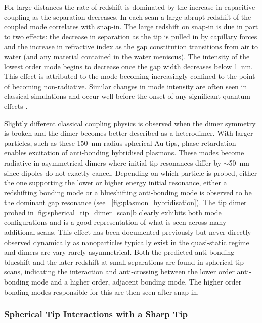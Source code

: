 \documentclass[a4paper]{article}
\begin{document}
For large distances the rate of redshift is dominated by the increase in capacitive coupling as the separation decreases. In each scan a large abrupt redshift of the coupled mode correlates with snap-in. The large redshift on snap-in is due in part to two effects: the decrease in separation as the tip is pulled in by capillary forces and the increase in refractive index as the gap constitution transitions from air to water (and any material contained in the water meniscus). The intensity of the lowest order mode begins to decrease once the gap width decreases below \SI{1}{nm}. This effect is attributed to the mode becoming increasingly confined to the point of becoming non-radiative. Similar changes in mode intensity are often seen in classical simulations and occur well before the onset of any significant quantum effects \cite{savage2012, esteban2015}.

Slightly different classical coupling physics is observed when the dimer symmetry is broken and the dimer becomes better described as a heterodimer. With larger particles, such as these \SI{150}{nm} radius spherical Au tips, phase retardation enables excitation of anti-bonding hybridised plasmons. These modes become radiative in asymmetrical dimers where initial tip resonances differ by $\sim$\SI{50}{nm} since dipoles do not exactly cancel. Depending on which particle is probed, either the one supporting the lower or higher energy initial resonance, either a redshifting bonding mode or a blueshifting anti-bonding mode is observed to be the dominant gap resonance (see \figurename~\ref{fig:plasmon_hybridisation}). The tip dimer probed in \autoref{fig:spherical_tip_dimer_scan}b clearly exhibits both mode configurations and is a good representation of what is seen across many additional scans.
This effect has been documented previously \cite{nordlander2004} but never directly observed dynamically as nanoparticles typically exist in the quasi-static regime and dimers are vary rarely asymmetrical. Both the predicted anti-bonding blueshift and the later redshift at small separations are found in spherical tip scans, indicating the interaction and anti-crossing between the lower order anti-bonding mode and a higher order, adjacent bonding mode. The higher order bonding modes responsible for this are then seen after snap-in.

\subsubsection{Spherical Tip Interactions with a Sharp Tip}
\end{document}
